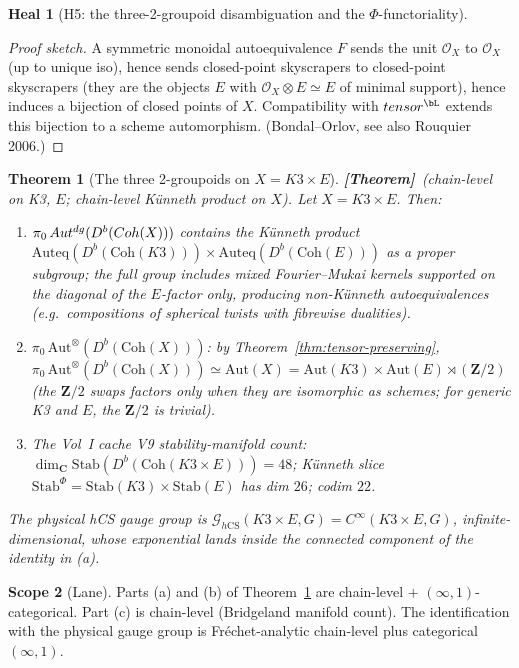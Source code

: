 \documentclass[11pt]{amsart}
\newtheorem{theorem}{Theorem}
\theoremstyle{definition}
\newtheorem{heal}[attack]{Heal}
\newtheorem{scope}[theorem]{Scope}
\providecommand{\Coh}{\mathrm{Coh}}
\providecommand{\Aut}{\mathrm{Aut}}
\providecommand{\Auteq}{\mathrm{Auteq}}
\providecommand{\Autdg}{\mathrm{Aut}^{\rm dg}}
\providecommand{\AutMon}{\mathrm{Aut}^{\otimes}}
\providecommand{\Stab}{\mathrm{Stab}}
\providecommand{\hCS}{h\mathrm{CS}}
\providecommand{\cO}{\mathcal{O}}
\providecommand{\cG}{\mathcal{G}}
\providecommand{\bC}{\mathbf{C}}
\providecommand{\bZ}{\mathbf{Z}}
\providecommand{\ClaimStatusTheorem}{\textbf{[Theorem]}}
\begin{document}
\begin{heal}[H5: the three-2-groupoid disambiguation and the
$\Phi$-functoriality]
\begin{proof}[Proof sketch]
A symmetric monoidal autoequivalence $F$ sends the unit $\cO_X$ to
$\cO_X$ (up to unique iso), hence sends closed-point skyscrapers to
closed-point skyscrapers (they are the objects $E$ with
$\cO_X \otimes E \simeq E$ of minimal support), hence induces a
bijection of closed points of $X$. Compatibility with
$\otimes^{\bL}$ extends this bijection to a scheme automorphism.
(Bondal--Orlov, see also Rouquier 2006.)
\end{proof}

\begin{theorem}[The three 2-groupoids on $X = K3 \times E$]
\label{thm:K3E-three-2gpd}
\ClaimStatusTheorem\ (chain-level on K3, $E$; chain-level
Künneth product on $X$). Let $X = K3 \times E$. Then:
\begin{enumerate}[label=(\alph*)]
 \item $\pi_0\,\Autdg(D^b(\Coh(X)))$ contains the Künneth product
   $\Auteq(D^b(\Coh(K3))) \times \Auteq(D^b(\Coh(E)))$ as a proper
   subgroup; the full group includes mixed Fourier--Mukai kernels
   supported on the diagonal of the $E$-factor only, producing
   non-Künneth autoequivalences (e.g.\ compositions of
   spherical twists with fibrewise dualities).
 \item $\pi_0\,\AutMon(D^b(\Coh(X)))$: by
   Theorem~\ref{thm:tensor-preserving},
   $\pi_0\,\AutMon(D^b(\Coh(X))) \simeq \Aut(X) = \Aut(K3) \times
   \Aut(E) \rtimes (\bZ/2)$ (the $\bZ/2$ swaps factors only when
   they are isomorphic as schemes; for generic K3 and $E$, the
   $\bZ/2$ is trivial).
 \item The Vol~I cache V9 stability-manifold count:
   $\dim_\bC \Stab(D^b(\Coh(K3 \times E))) = 48$;
   Künneth slice $\Stab^\Phi = \Stab(K3) \times \Stab(E)$ has
   dim $26$; codim $22$.
\end{enumerate}
The physical hCS gauge group is
$\cG_{\hCS}(K3 \times E, G) = C^\infty(K3 \times E, G)$,
infinite-dimensional, whose exponential lands inside the
connected component of the identity in (a).
\end{theorem}

\begin{scope}[Lane]
Parts (a) and (b) of Theorem~\ref{thm:K3E-three-2gpd} are chain-level
$+$ $(\infty,1)$-categorical. Part (c) is chain-level (Bridgeland
manifold count). The identification with the physical gauge group is
Fr\'echet-analytic chain-level plus categorical $(\infty,1)$.
\end{scope}


\end{heal}
\end{document}
